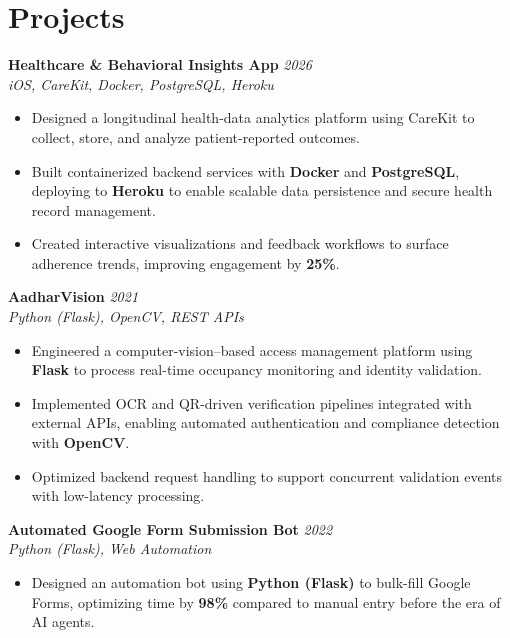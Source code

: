 \documentclass[letterpaper,11pt]{article}
\begin{document}
\section*{Projects}

\textbf{Healthcare \& Behavioral Insights App} \hfill \textit{2026} \\
\textit{iOS, CareKit, Docker, PostgreSQL, Heroku}
\begin{itemize} \itemsep -2pt
    \item Designed a longitudinal health-data analytics platform using CareKit to collect, store, and analyze patient-reported outcomes.
    \item Built containerized backend services with \textbf{Docker} and \textbf{PostgreSQL}, deploying to \textbf{Heroku} to enable scalable data persistence and secure health record management.
    \item Created interactive visualizations and feedback workflows to surface adherence trends, improving engagement by \textbf{25\%}.
\end{itemize}

\textbf{AadharVision} \hfill \textit{2021} \\
\textit{Python (Flask), OpenCV, REST APIs}
\begin{itemize} \itemsep -2pt
    \item Engineered a computer-vision–based access management platform using \textbf{Flask} to process real-time occupancy monitoring and identity validation.
    \item Implemented OCR and QR-driven verification pipelines integrated with external APIs, enabling automated authentication and compliance detection with \textbf{OpenCV}.
    \item Optimized backend request handling to support concurrent validation events with low-latency processing.
\end{itemize}

\textbf{Automated Google Form Submission Bot} \hfill \textit{2022} \\
\textit{Python (Flask), Web Automation}
\begin{itemize} \itemsep -2pt
    \item Designed an automation bot using \textbf{Python (Flask)} to bulk-fill Google Forms, optimizing time by \textbf{98\%} compared to manual entry before the era of AI agents.
\end{itemize}
\end{document}
